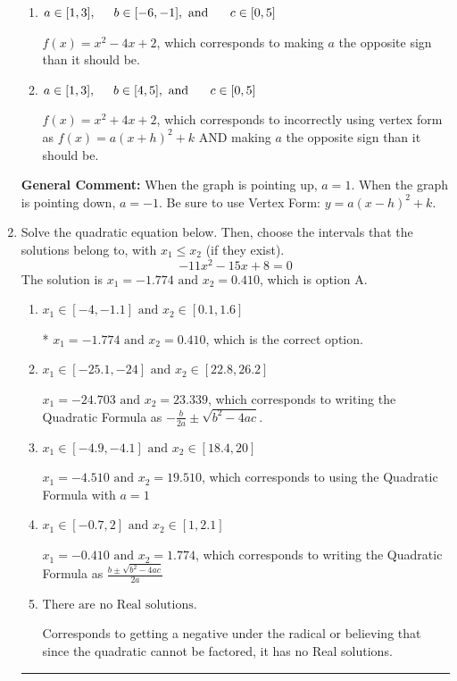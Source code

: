 \documentclass{extbook}[14pt]
\newcommand{\litem}[1]{\item #1

\rule{\textwidth}{0.4pt}}
\begin{document}
\begin{enumerate}
{\begin{enumerate}[label=\Alph*.]
* $f(x)=-x^{2} +4 x -6$, which is the correct option.
\item \( a \in [1, 3], \hspace*{5mm} b \in [-6, -1], \text{ and } \hspace*{5mm} c \in [0, 5] \)

$f(x)=x^{2} -4 x + 2$, which corresponds to making $a$ the opposite sign than it should be.
\item \( a \in [1, 3], \hspace*{5mm} b \in [4, 5], \text{ and } \hspace*{5mm} c \in [0, 5] \)

$f(x)=x^{2} +4 x + 2$, which corresponds to incorrectly using vertex form as $f(x) = a(x+h)^2+k$ AND making $a$ the opposite sign than it should be.
\end{enumerate}

\textbf{General Comment:} When the graph is pointing up, $a=1$. When the graph is pointing down, $a=-1$. Be sure to use Vertex Form: $y = a(x-h)^2+k$.
}
\litem{
Solve the quadratic equation below. Then, choose the intervals that the solutions belong to, with $x_1 \leq x_2$ (if they exist).
\[ -11x^{2} -15 x + 8 = 0 \]The solution is \( x_1 = -1.774 \text{ and } x_2 = 0.410 \), which is option A.\begin{enumerate}[label=\Alph*.]
\item \( x_1 \in [-4, -1.1] \text{ and } x_2 \in [0.1, 1.6] \)

* $x_1 = -1.774 \text{ and } x_2 = 0.410$, which is the correct option.
\item \( x_1 \in [-25.1, -24] \text{ and } x_2 \in [22.8, 26.2] \)

 $x_1 = -24.703 \text{ and } x_2 = 23.339$, which corresponds to writing the Quadratic Formula as $-\frac{b}{2a} \pm \sqrt{b^2 - 4ac}$.
\item \( x_1 \in [-4.9, -4.1] \text{ and } x_2 \in [18.4, 20] \)

 $x_1 = -4.510 \text{ and } x_2 = 19.510$, which corresponds to using the Quadratic Formula with $a=1$
\item \( x_1 \in [-0.7, 2] \text{ and } x_2 \in [1, 2.1] \)

 $x_1 = -0.410 \text{ and } x_2 = 1.774$, which corresponds to writing the Quadratic Formula as $\frac{b \pm \sqrt{b^2 - 4ac}}{2a}$
\item \( \text{There are no Real solutions.} \)

Corresponds to getting a negative under the radical or believing that since the quadratic cannot be factored, it has no Real solutions.
\end{enumerate}

}
\end{enumerate}
\end{document}
